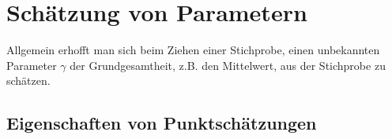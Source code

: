 \section{Schätzung von Parametern}
Allgemein erhofft man sich beim Ziehen einer Stichprobe, einen unbekannten Parameter $\gamma$ der Grundgesamtheit, z.B. den Mittelwert, aus der Stichprobe zu schätzen.
\subsection{Eigenschaften von Punktschätzungen}

